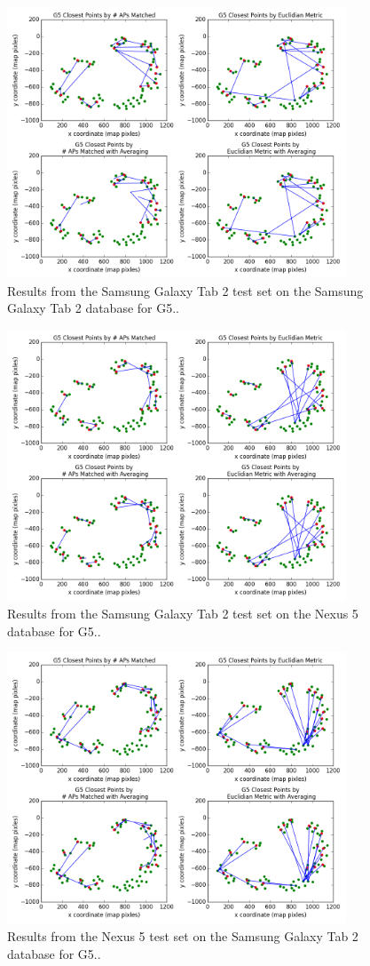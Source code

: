 \documentclass[11pt]{article}
\begin{document}
\begin{figure}[h]
\centering \includegraphics[width=0.9\textwidth]{samsungG5trainsamsungG5test_all_graphs.png}
\caption{Results from the Samsung Galaxy Tab 2 test set on the Samsung Galaxy Tab 2 database for G5..}
\label{fig:tunnels_all}
\end{figure}
\begin{figure}[h]
\centering \includegraphics[width=0.9\textwidth]{samsungG5trainnexusG5test_all_graphs.png}
\caption{Results from the Samsung Galaxy Tab 2 test set on the Nexus 5 database for G5..}
\label{fig:tunnels_all}
\end{figure}
\begin{figure}[h]
\centering \includegraphics[width=0.9\textwidth]{nexusG5trainsamsungG5test_all_graphs.png}
\caption{Results from the Nexus 5 test set on the Samsung Galaxy Tab 2 database for G5..}
\label{fig:tunnels_all}
\end{figure}
\end{document}
